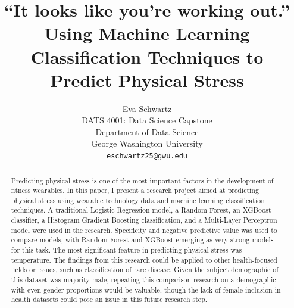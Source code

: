 \documentclass{article}
\title{\textbf{“It looks like you’re working out.”\\Using Machine Learning Classification Techniques to Predict Physical Stress}}
\author{
\begin{tabular}{c}
Eva Schwartz \\
DATS 4001: Data Science Capstone \\
Department of Data Science \\
George Washington University \\
\texttt{eschwartz25@gwu.edu}
\end{tabular}
}
\date{} %
\begin{document}
\maketitle

\twocolumn

\begin{abstract}
Predicting physical stress is one of the most important factors in the development of fitness wearables. In this paper, I present a research project aimed at predicting physical stress using wearable technology data and machine learning classification techniques. A traditional Logistic Regression model, a Random Forest, an XGBoost classifier, a Histogram Gradient Boosting classification, and a Multi-Layer Perceptron model were used in the research. Specificity and negative predictive value was used to compare models, with Random Forest and XGBoost emerging as very strong models for this task. The most significant feature in predicting physical stress was temperature. The findings from this research could be applied to other health-focused fields or issues, such as classification of rare disease. Given the subject demographic of this dataset was majority male, repeating this comparison research on a demographic with even gender proportions would be valuable, though the lack of female inclusion in health datasets could pose an issue in this future research step.
\end{abstract}
\end{document}
